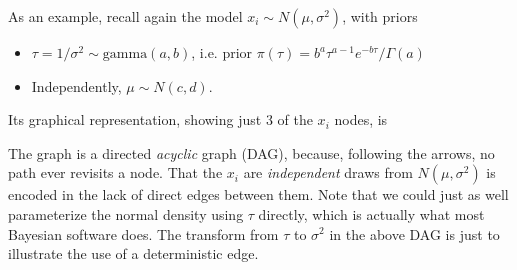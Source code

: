 \documentclass[10pt] {article}
\newcommand{\eps}[3]
{{\begin{center}
 \rotatebox{#1}{\scalebox{#2}{\texttt{[image: \#3]}}}
 \end{center}}
}
\theoremstyle{definition}
\begin{document}
As an example, recall again the model $x_i \sim N(\mu, \sigma^2)$, with priors
\begin{itemize}
\item $\tau = 1/\sigma^2 \sim \text{gamma}(a,b)$, i.e. prior $\pi(\tau) = b^a \tau^{a-1} e^{-b\tau}/\Gamma(a)$ 
\item Independently, $\mu \sim N(c,d)$.
\end{itemize}
Its graphical representation, showing just 3 of the $x_i $ nodes, is
\eps{-90}{.5}{norm-dag.eps}
\noindent The graph is a directed {\em acyclic } graph (DAG), because, following the arrows, no path ever revisits a node.
That the $x_i$ are {\em independent} draws from $ N(\mu, \sigma^2)$ is encoded in the lack of direct edges between them. Note that we could just as well parameterize the normal density using $\tau$ directly, which is actually what most Bayesian software does. The transform from $\tau$ to $\sigma^2$ in the above DAG is just to illustrate the use of a deterministic edge. 
\end{document}
